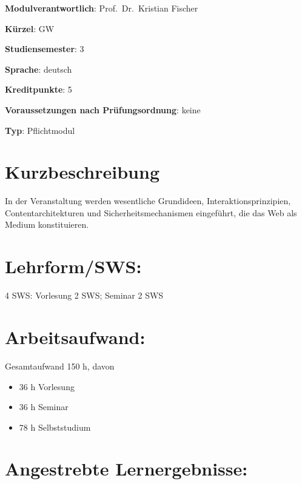\begin{modulHead}
\textbf{Modulverantwortlich}: Prof.~Dr.~Kristian
Fischer
\end{modulHead}
\begin{modulHead}
\textbf{Kürzel}:
GW
\end{modulHead}
\begin{modulHead}
\textbf{Studiensemester}:
3
\end{modulHead}
\begin{modulHead}
\textbf{Sprache}:
deutsch
\end{modulHead}
\begin{modulHead}
\textbf{Kreditpunkte}:
5
\end{modulHead}
\begin{modulHead}
\textbf{Voraussetzungen nach
Prüfungsordnung}: keine
\end{modulHead}
\begin{modulHead}
\textbf{Typ}:
Pflichtmodul
\end{modulHead}


\section*{Kurzbeschreibung}\label{kurzbeschreibung-2}

In der Veranstaltung werden wesentliche Grundideen,
Interaktionsprinzipien, Contentarchitekturen und Sicherheitsmechanismen
eingeführt, die das Web als Medium konstituieren.

\section*{Lehrform/SWS:}\label{lehrformsws-11}

4 SWS: Vorlesung 2 SWS; Seminar 2 SWS

\section*{Arbeitsaufwand:}\label{arbeitsaufwand-11}

Gesamtaufwand 150 h, davon

\begin{itemize}
\tightlist
\item
  36 h Vorlesung
\item
  36 h Seminar
\item
  78 h Selbststudium
\end{itemize}

\section*{Angestrebte
Lernergebnisse:}\label{angestrebte-lernergebnisse-11}

